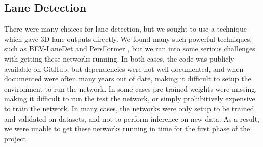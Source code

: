 \subsection{Lane Detection}
There were many choices for lane detection, but we sought to use a technique which gave 3D lane outputs directly. We found many such powerful techniques, such as BEV-LaneDet \cite{BEV-LaneDet} and PersFormer \cite{PersFormer}, but we ran into some serious challenges with getting these networks running. In both cases, the code was publicly available on GitHub, but dependencies were not well documented, and when documented were often many years out of date, making it difficult to setup the environment to run the network. In some cases pre-trained weights were missing, making it difficult to run the test the network, or simply prohibitively expensive to train the network. In many cases, the networks were only setup to be trained and validated on datasets, and not to perform inference on new data. As a result, we were unable to get these networks running in time for the first phase of the project.

